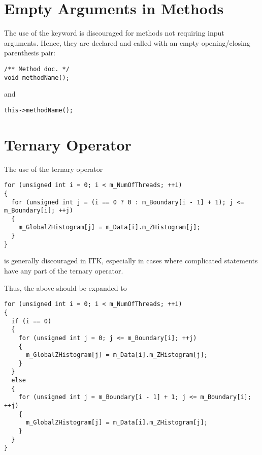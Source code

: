 \section{Empty Arguments in Methods}
\label{sec:EmptyArgumentInMethods}

The use of the  keyword is discouraged for methods not requiring
input arguments. Hence, they are declared and called with an empty
opening/closing parenthesis pair:

\small
\begin{verbatim}
/** Method doc. */
void methodName();
\end{verbatim}
\normalsize

and

\small
\begin{verbatim}
this->methodName();
\end{verbatim}
\normalsize


\section{Ternary Operator}
\label{sec:TernaryOperator}

The use of the ternary operator

\small
\begin{verbatim}
for (unsigned int i = 0; i < m_NumOfThreads; ++i)
{
  for (unsigned int j = (i == 0 ? 0 : m_Boundary[i - 1] + 1); j <= m_Boundary[i]; ++j)
  {
    m_GlobalZHistogram[j] = m_Data[i].m_ZHistogram[j];
  }
}
\end{verbatim}
\normalsize

is generally discouraged in ITK, especially in cases where complicated
statements have any part of the ternary operator.

Thus, the above should be expanded to

\small
\begin{verbatim}
for (unsigned int i = 0; i < m_NumOfThreads; ++i)
{
  if (i == 0)
  {
    for (unsigned int j = 0; j <= m_Boundary[i]; ++j)
    {
      m_GlobalZHistogram[j] = m_Data[i].m_ZHistogram[j];
    }
  }
  else
  {
    for (unsigned int j = m_Boundary[i - 1] + 1; j <= m_Boundary[i]; ++j)
    {
      m_GlobalZHistogram[j] = m_Data[i].m_ZHistogram[j];
    }
  }
}
\end{verbatim}
\normalsize

